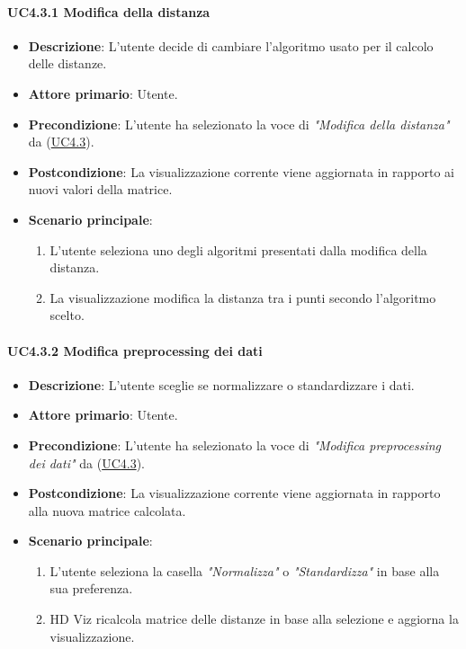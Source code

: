 \paragraph{UC4.3.1 Modifica della distanza}
\label{par:uc4.3.1}
\begin{itemize}
    \item \textbf{Descrizione}: L’utente decide di cambiare l’algoritmo usato per il calcolo delle distanze.

    \item \textbf{Attore primario}: Utente.
    
    \item \textbf{Precondizione}:   L'utente ha selezionato la voce di \emph{"Modifica della distanza"} da (\hyperref[ssub:uc4.3]{UC4.3}).
    \item \textbf{Postcondizione}:  La visualizzazione corrente viene aggiornata in rapporto ai nuovi valori della matrice.

	\item \textbf{Scenario principale}:
        \begin{enumerate}
            \item L'utente seleziona uno degli algoritmi presentati dalla modifica della distanza.
            \item La visualizzazione modifica la distanza tra i punti secondo l'algoritmo scelto.
        \end{enumerate}
\end{itemize}

\paragraph{UC4.3.2 Modifica preprocessing dei dati}
\label{par:uc4.3.2}
\begin{itemize}
    \item \textbf{Descrizione}: L’utente sceglie se normalizzare o standardizzare i dati.

    \item \textbf{Attore primario}: Utente.
    \item \textbf{Precondizione}: L'utente ha selezionato la voce di \emph{"Modifica preprocessing dei dati"} da (\hyperref[ssub:uc4.3]{UC4.3}).
    \item \textbf{Postcondizione}: La visualizzazione corrente viene aggiornata in rapporto alla nuova matrice calcolata.
    \item \textbf{Scenario principale}:
    \begin{enumerate}
        \item L'utente seleziona la casella \emph{"Normalizza"} o \emph{"Standardizza"} in base alla sua preferenza.
        \item HD Viz ricalcola matrice delle distanze in base alla selezione e aggiorna la visualizzazione.
    \end{enumerate}
\end{itemize}

